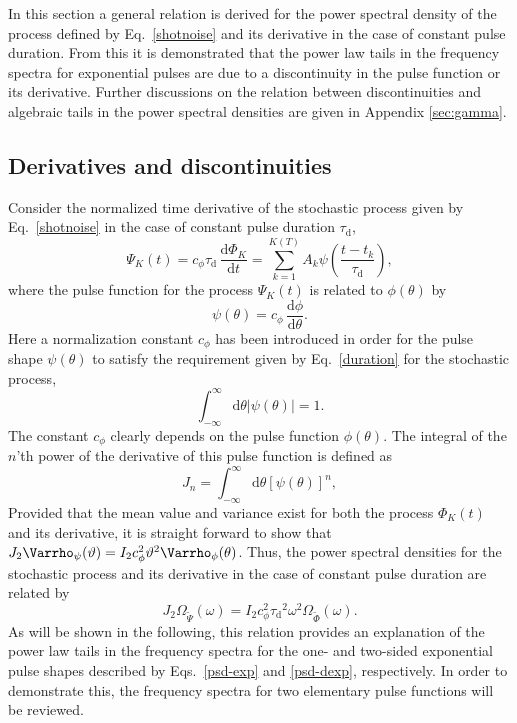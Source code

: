 \documentclass[aps,prb,12pt,a4paper,preprint,amsmath,amssymb,groupedaddress]{revtex4-1}
\newcommand{\abs}[1]{{\left|#1\right|}}\newcommand{\order}[1]{{\mathcal{O}\left(#1\right)}}
\newcommand{\rmd}{\text{d}}
\newcommand{\taud}{\ensuremath{\tau_\text{d}}}
\newcommand{\Phiwt}{\ensuremath{\widetilde{\Phi}}}
\newcommand{\Psiwt}{\ensuremath{\widetilde{\Psi}}}
\newcommand{\Eqref}[1]{Eq.~\eqref{#1}}
\newcommand{\Eqsref}[1]{Eqs.~\eqref{#1}}
\begin{document}
In this section a general relation is derived for the power spectral density of the process defined by \Eqref{shotnoise} and its derivative in the case of constant pulse duration. From this it is demonstrated that the power law tails in the frequency spectra for exponential pulses are due to a discontinuity in the pulse function or its derivative. Further discussions on the relation between discontinuities and algebraic tails in the power spectral densities are given in Appendix \ref{sec:gamma}.



\subsection{Derivatives and discontinuities}



Consider the normalized time derivative of the stochastic process given by \Eqref{shotnoise} in the case of constant pulse duration $\taud$,
\begin{equation}
\Psi_K(t) = c_\phi \taud\,\frac{\rmd\Phi_K}{\rmd t} = \sum_{k=1}^{K(T)} A_k \psi\left(\frac{t-t_k}{\taud}\right) ,
\end{equation}
where the pulse function for the process $\Psi_K(t)$ is related to $\phi(\theta)$ by
\begin{equation}
\psi(\theta) = c_\phi\,\frac{\rmd\phi}{\rmd\theta} .
\end{equation}
Here a normalization constant $c_\phi$ has been introduced in order for the pulse shape $\psi(\theta)$ to satisfy the requirement given by \Eqref{duration} for the stochastic process,
\begin{equation}
\int_{-\infty}^{\infty} \rmd\theta\abs{\psi(\theta)} = 1 .
\end{equation}
The constant $c_\phi$ clearly depends on the pulse function $\phi(\theta)$. The integral of the $n$'th power of the derivative of this pulse function is defined as
\begin{equation}
J_n = \int_{-\infty}^{\infty} \rmd\theta[\psi(\theta)]^n ,
\end{equation}
Provided that the mean value and variance exist for both the process $\Phi_K(t)$ and its derivative, it is straight forward to show that $J_2\Varrho_\psi(\vartheta)=I_2 c_\phi^2 \vartheta^2\Varrho_\phi(\theta)$. Thus, the power spectral densities for the stochastic process and its derivative in the case of constant pulse duration are related by
\begin{equation}\label{psd-ddt}
J_2 \Omega_{\Psiwt}(\omega) = I_2 c_\phi^2\taud^2\omega^2 \Omega_{\Phiwt}(\omega) .
\end{equation}
As will be shown in the following, this relation provides an explanation of the power law tails in the frequency spectra for the one- and two-sided exponential pulse shapes described by \Eqsref{psd-exp} and \eqref{psd-dexp}, respectively. In order to demonstrate this, the frequency spectra for two elementary pulse functions will be reviewed.
\end{document}
